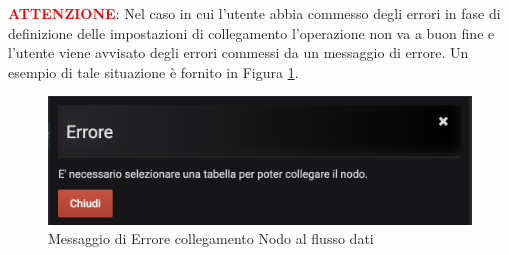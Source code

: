 \textbf{\textcolor{red}{ATTENZIONE}}: Nel caso in cui l'utente abbia commesso degli errori in fase di definizione delle impostazioni di collegamento l'operazione non va a buon fine e l'utente viene avvisato degli errori commessi da un messaggio di errore. Un esempio di tale situazione è fornito in Figura \ref{ErroreCollegamento}.

\begin{figure}[H]
	\begin{center}
		\includegraphics[scale=0.6]{./images/ErroreCollegamento.png}
		 \caption{Messaggio di Errore collegamento Nodo al flusso dati}	
		 \label{ErroreCollegamento}
	\end{center}
\end{figure}
 